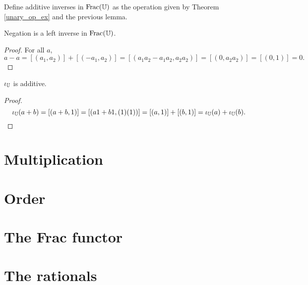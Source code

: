 \documentclass[../../math.tex]{subfiles}
\begin{document}
\begin{instance}
    Define additive inverses in $\operatorname{Frac}(\mathbb{U})$ as the operation given by Theorem
    \ref{unary_op_ex} and the previous lemma.
\end{instance}

\begin{instance}
    Negation is a left inverse in $\operatorname{Frac}(\mathbb{U})$.
\end{instance}
\begin{proof}
    For all $a$,
    \[
        a - a =
        [(a_1, a_2)] + [(-a_1, a_2)] =
        [(a_1a_2 - a_1a_2, a_2a_2)] =
        [(0, a_2a_2)] =
        [(0, 1)] =
        0.
    \]
\end{proof}

\begin{instance}
    $\iota_{\mathbb{U}}$ is additive.
\end{instance}
\begin{proof}
    \[
        \iota_{\mathbb{U}}(a + b) =
        [(a + b, 1)] =
        [(a1 + b1, (1)(1))] =
        [(a, 1)] + [(b, 1)] =
        \iota_{\mathbb{U}}(a) + \iota_{\mathbb{U}}(b).
    \]
\end{proof}

\section{Multiplication}

\section{Order}

\section{The Frac functor}

\section{The rationals}
\end{document}
